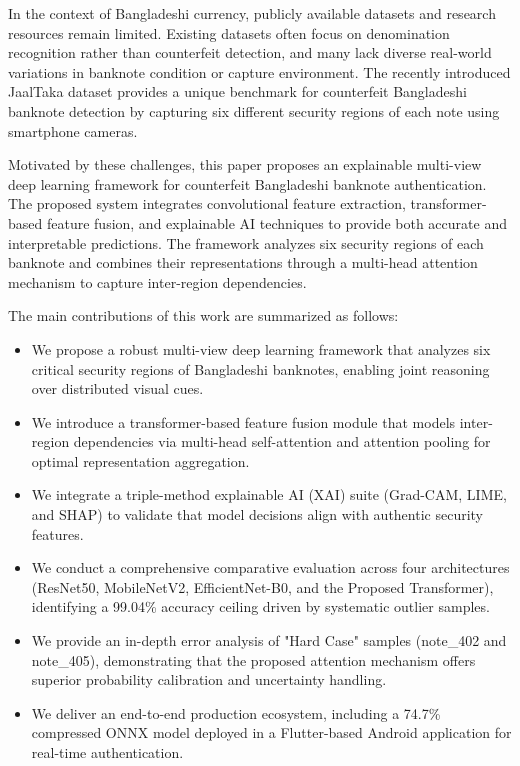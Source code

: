 \documentclass[preprint,12pt,authoryear]{elsarticle}
\begin{document}
In the context of Bangladeshi currency, publicly available datasets and research resources remain limited. Existing datasets often focus on denomination recognition rather than counterfeit detection, and many lack diverse real-world variations in banknote condition or capture environment. The recently introduced JaalTaka dataset provides a unique benchmark for counterfeit Bangladeshi banknote detection by capturing six different security regions of each note using smartphone cameras.

Motivated by these challenges, this paper proposes an explainable multi-view deep learning framework for counterfeit Bangladeshi banknote authentication. The proposed system integrates convolutional feature extraction, transformer-based feature fusion, and explainable AI techniques to provide both accurate and interpretable predictions. The framework analyzes six security regions of each banknote and combines their representations through a multi-head attention mechanism to capture inter-region dependencies.

The main contributions of this work are summarized as follows:

\begin{itemize}
\item We propose a robust multi-view deep learning framework that analyzes six critical security regions of Bangladeshi banknotes, enabling joint reasoning over distributed visual cues.
\item We introduce a transformer-based feature fusion module that models inter-region dependencies via multi-head self-attention and attention pooling for optimal representation aggregation.
\item We integrate a triple-method explainable AI (XAI) suite (Grad-CAM, LIME, and SHAP) to validate that model decisions align with authentic security features.
\item We conduct a comprehensive comparative evaluation across four architectures (ResNet50, MobileNetV2, EfficientNet-B0, and the Proposed Transformer), identifying a 99.04\% accuracy ceiling driven by systematic outlier samples.
\item We provide an in-depth error analysis of "Hard Case" samples (note\_402 and note\_405), demonstrating that the proposed attention mechanism offers superior probability calibration and uncertainty handling.
\item We deliver an end-to-end production ecosystem, including a 74.7\% compressed ONNX model deployed in a Flutter-based Android application for real-time authentication.
\end{itemize}
\end{document}
